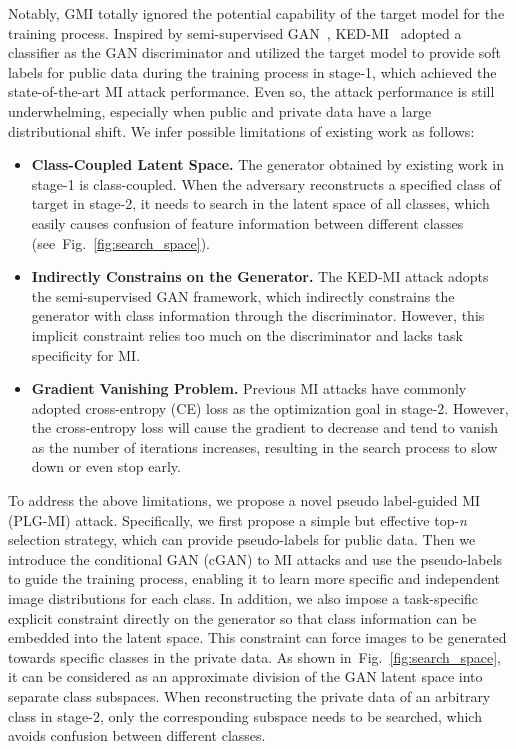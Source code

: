 \documentclass[letterpaper]{article} %
\newcommand{\Fref}[1]{Fig.~\ref{#1}}
\begin{document}
Notably, GMI totally ignored the potential capability of the target model for the training process. Inspired by semi-supervised GAN~\cite{salimans2016improved}, KED-MI~\cite{chen2021knowledge} adopted a classifier as the GAN discriminator and utilized the target model to provide soft labels for public data during the training process in stage-1, which achieved the state-of-the-art MI attack performance. Even so, the attack performance is still underwhelming, especially when public and private data have a large distributional shift. We infer possible limitations of existing work as follows:
\begin{itemize}
    \item [1)] \textbf{Class-Coupled Latent Space.}
    The generator obtained by existing work in stage-1 is class-coupled. When the adversary reconstructs a specified class of target in stage-2, it needs to search in the latent space of all classes, which easily causes confusion of feature information between different classes (see~\Fref{fig:search_space}).
    \item [2)] \textbf{Indirectly Constrains on the Generator.}
    The KED-MI attack adopts the semi-supervised GAN framework, which indirectly constrains the generator with class information through the discriminator. However, this implicit constraint relies too much on the discriminator and lacks task specificity for MI.
    \item [3)]\textbf{Gradient Vanishing Problem.}
    Previous MI attacks have commonly adopted cross-entropy (CE) loss as the optimization goal in stage-2. However, the cross-entropy loss will cause the gradient to decrease and tend to vanish as the number of iterations increases, resulting in the search process to slow down or even stop early.
\end{itemize}


To address the above limitations, we propose a novel pseudo label-guided MI (PLG-MI) attack. Specifically, we first propose a simple but effective top-\emph{n} selection strategy, which can provide pseudo-labels for public data. Then we introduce the conditional GAN (cGAN) to MI attacks and use the pseudo-labels to guide the training process, enabling it to learn more specific and independent image distributions for each class. In addition, we also impose a task-specific explicit constraint directly on the generator so that class information can be embedded into the latent space. This constraint can force images to be generated towards specific classes in the private data. As shown in~\Fref{fig:search_space}, it can be considered as an approximate division of the GAN latent space into separate class subspaces. When reconstructing the private data of an arbitrary class in stage-2, only the corresponding subspace needs to be searched, which avoids confusion between different classes.
\end{document}
